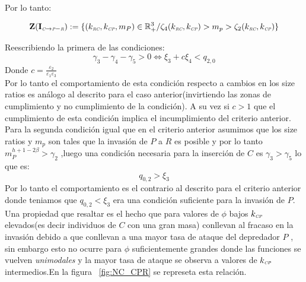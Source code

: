 Por lo tanto:

\begin{equation}
\mathbf{Z(I_{\textit{\tiny C} \to \textit{\tiny P}-\textit{\tiny R}})} := \{ (k_{\textit{\tiny RC}},k_{\textit{\tiny CP}},m_P) \in \mathbb{R}^3_+ / \zeta_4(k_{\textit{\tiny RC}},k_{\textit{\tiny CP}}) > m_p > \zeta_2(k_{\textit{\tiny RC}},k_{\textit{\tiny CP}}) \}
\end{equation}

Reescribiendo la primera de las condiciones:
\begin{equation}
  \gamma_3 - \gamma_4 - \gamma_5 >0 \iff \xi_3 + c \xi_4 < q_{2,0}
\end{equation}
Donde  $c = \frac{\varepsilon_2}{\varepsilon_1 \varepsilon_3}$ \\
Por lo tanto el comportamiento de esta condici\'on respecto a cambios en los size ratios es an\'alogo al descrito para el caso anterior(invirtiendo las zonas de cumplimiento y no cumplimiento de la condici\'on). A su vez si $c>1$ que el cumplimiento de esta condici\'on implica el incumplimiento del criterio anterior.\\
Para la segunda condici\'on igual que en el criterio anterior asumimos que los size ratios y $m_p$ son tales que la invasi\'on de $P$ a $R$ es posible y por lo tanto  $m_P^{h + 1 - 2\beta} > \gamma_2$ ,luego una condici\'on necesaria para la inserci\'on de $C$ es $ \gamma_3 > \gamma_5$ lo que es:
\begin{equation}
  q_{0,2} > \xi_3
\end{equation}
Por lo tanto el comportamiento es el contrario al descrito para el criterio anterior donde teniamos que $q_{0,2} < \xi_3$ era una condici\'on suficiente para la invasi\'on de $P$. Una propiedad que resaltar es el hecho que para valores de $\phi$ bajos $k_{\textit{\tiny CP}}$ elevados(es decir individuos de $C$ con una gran masa) conllevan al fracaso en la invasi\'on debido a que conllevan a una mayor tasa de ataque del depredador $P$ , sin embargo esto no ocurre para $\phi$ suficientemente grandes
 donde las funciones se vuelven \emph{unimodales} y la mayor tasa de ataque se observa a valores de $k_{\textit{\tiny CP}}$ intermedios.En la figura ~\ref{fig:NC_CPR} se represeta esta relaci\'on. \\



